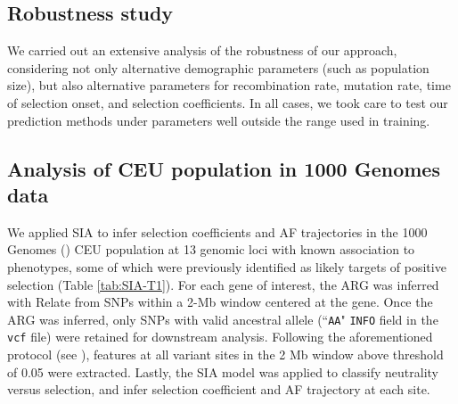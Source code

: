 \subsection{Robustness study}
We carried out an extensive analysis of the robustness of our approach, considering not only alternative demographic parameters (such as population size), but also alternative parameters for recombination rate, mutation rate, time of selection onset, and selection coefficients. In all cases, we took care to test our prediction methods under parameters well outside the range used in training.

\subsection{Analysis of CEU population in 1000 Genomes data}
We applied \ac{SIA} to infer selection coefficients and \ac{AF} trajectories in the 1000 Genomes (\cite{auton_global_2015}) CEU population at 13 genomic loci with known association to phenotypes, some of which were previously identified as likely targets of positive selection (Table \ref{tab:SIA-T1}). For each gene of interest, the \ac{ARG} was inferred with Relate from \acsp{SNP} within a 2-Mb window centered at the gene. Once the \ac{ARG} was inferred, only \acsp{SNP} with valid ancestral allele (``\texttt{AA}" \texttt{INFO} field in the \texttt{vcf} file) were retained for downstream analysis. Following the aforementioned protocol (see ), features at all variant sites in the 2 Mb window above  threshold of 0.05 were extracted. Lastly, the \ac{SIA} model was applied to classify neutrality versus selection, and infer selection coefficient and \ac{AF} trajectory at each site.

